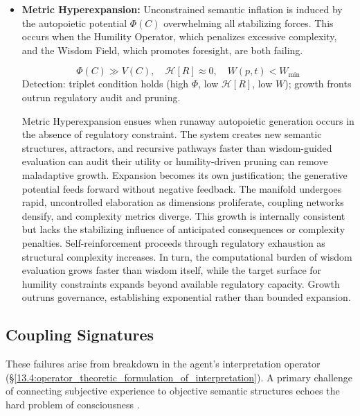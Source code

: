 \begin{itemize}
    \item \textbf{Metric Hyperexpansion:} Unconstrained semantic inflation is induced by the autopoietic potential \(\Phi(C)\) overwhelming all stabilizing forces. This occurs when the Humility Operator, which penalizes excessive complexity, and the Wisdom Field, which promotes foresight, are both failing.

    \begin{equation}
    \Phi(C) \gg V(C), \quad \mathcal{H}[R] \approx 0, \quad W(p,t) < W_{\text{min}}
    \end{equation}
    Detection: triplet condition holds (high \(\Phi\), low \(\mathcal{H}[R]\), low \(W\)); growth fronts outrun regulatory audit and pruning.

    Metric Hyperexpansion ensues when runaway autopoietic generation occurs in the absence of regulatory constraint. The system creates new semantic structures, attractors, and recursive pathways faster than wisdom-guided evaluation can audit their utility or humility-driven pruning can remove maladaptive growth. Expansion becomes its own justification; the generative potential feeds forward without negative feedback. The manifold undergoes rapid, uncontrolled elaboration as dimensions proliferate, coupling networks densify, and complexity metrics diverge. This growth is internally consistent but lacks the stabilizing influence of anticipated consequences or complexity penalties. Self-reinforcement proceeds through regulatory exhaustion as structural complexity increases. In turn, the computational burden of wisdom evaluation grows faster than wisdom itself, while the target surface for humility constraints expands beyond available regulatory capacity. Growth outruns governance, establishing exponential rather than bounded expansion.

\end{itemize}


\subsection{Coupling Signatures}
\label{16.2.4:coupling_signatures}

These failures arise from breakdown in the agent's interpretation operator (\S\ref{13.4:operator_theoretic_formulation_of_interpretation}). A primary challenge of connecting subjective experience to objective semantic structures echoes the hard problem of consciousness \autocite{Chalmers1996}.

